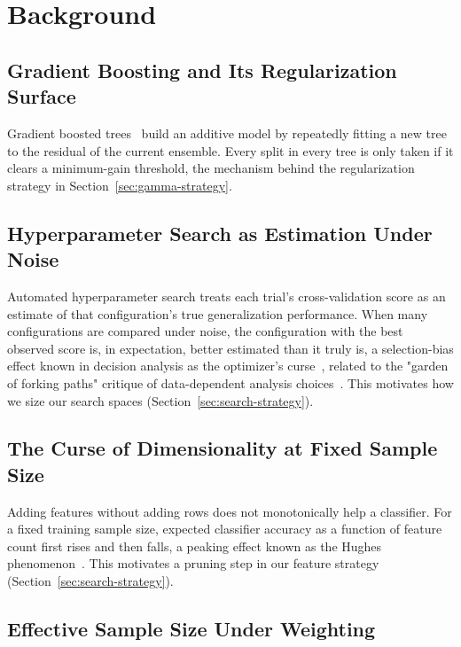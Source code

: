 \documentclass[conference]{IEEEtran}
\begin{document}
\section{Background}
\label{sec:background}

\subsection{Gradient Boosting and Its Regularization Surface}

Gradient boosted trees~\cite{chen2016,ke2017,prokhorenkova2018} build
an additive model by repeatedly fitting a new tree to the residual of
the current ensemble. Every split in every tree is only taken if it
clears a minimum-gain threshold, the mechanism behind the
regularization strategy in Section~\ref{sec:gamma-strategy}.

\subsection{Hyperparameter Search as Estimation Under Noise}

Automated hyperparameter search treats each trial's cross-validation
score as an estimate of that configuration's true generalization
performance. When many configurations are compared under noise, the
configuration with the best observed score is, in expectation, better
estimated than it truly is, a selection-bias effect known in decision
analysis as the optimizer's curse~\cite{smithwinkler2006}, related to
the "garden of forking paths" critique of data-dependent analysis
choices~\cite{gelmanloken2014}. This motivates how we size our search
spaces (Section~\ref{sec:search-strategy}).

\subsection{The Curse of Dimensionality at Fixed Sample Size}

Adding features without adding rows does not monotonically help a
classifier. For a fixed training sample size, expected classifier
accuracy as a function of feature count first rises and then falls, a
peaking effect known as the Hughes phenomenon~\cite{hughes1968}. This
motivates a pruning step in our feature strategy
(Section~\ref{sec:search-strategy}).

\subsection{Effective Sample Size Under Weighting}
\end{document}

